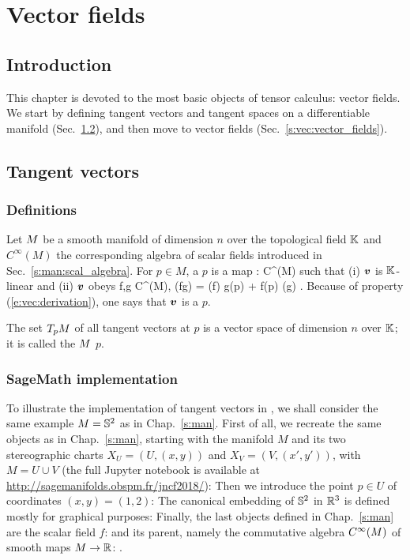 \chapter{Vector fields} \label{s:vec}

\minitoc

\section{Introduction}

This chapter is devoted to the most basic objects of tensor calculus:
vector fields. We start by defining tangent vectors and tangent spaces
on a differentiable manifold (Sec.~\ref{s:vec:tangent_vectors}), and then
move to vector fields (Sec.~\ref{s:vec:vector_fields}).

\section{Tangent vectors} \label{s:vec:tangent_vectors}

\subsection{Definitions} \label{s:vec:def_tangent_vector}

Let $M$ be a smooth manifold of dimension $n$ over the topological field $\mathbb{K}$
and $C^\infty(M)$ the corresponding algebra of scalar fields introduced in Sec.~\ref{s:man:scal_algebra}.
For $p\in M$, a  $p$ is
a map
\be
    : C^\infty(M) \longrightarrow \K
\ee
such that (i) $\bm{v}$ is $\mathbb{K}$-linear and (ii) $\bm{v}$ obeys
\be \label{e:vec:derivation}
    \forall f,g \in C^\infty(M),\quad
        (fg) = (f) g(p) + f(p) (g) .
\ee
Because of property (\ref{e:vec:derivation}), one says that $\bm{v}$ is
a  $p$.

The set $T_pM$ of all tangent vectors at $p$ is a vector space of dimension
$n$ over $\mathbb{K}$; it is called the  $M$
 $p$.

\subsection{SageMath implementation} \label{s:vec:tangent_impl}

To illustrate the implementation of tangent vectors in \Sage{}, we shall
consider the same example $M=\mathbb{S}^2$ as in Chap.~\ref{s:man}. First of all,
we recreate the same objects as in Chap.~\ref{s:man}, starting with the manifold
$M$ and its two stereographic charts $X_U = (U,(x,y))$ and $X_V = (V,(x',y'))$,
with $M=U\cup V$ (the full Jupyter notebook is available at
\url{http://sagemanifolds.obspm.fr/jncf2018/}):
Then we introduce the point $p\in U$ of coordinates $(x,y)=(1,2)$:
The canonical embedding of $\mathbb{S}^2$ in $\mathbb{R}^3$ is defined mostly for
graphical purposes:
Finally, the last objects defined in Chap.~\ref{s:man} are the
scalar field $f$:
and its parent, namely the commutative algebra $C^\infty(M)$ of
smooth maps $M\to\mathbb{R}$:
.

